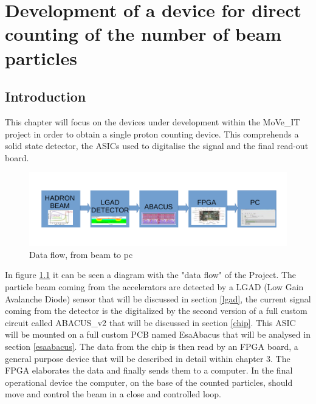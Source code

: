 \chapter{Development of a device for direct counting of the number of beam particles}

\section{Introduction}
This chapter will focus on the devices under development within the MoVe\_IT project in order to obtain a single proton counting device.
This comprehends a solid state detector, the ASICs used to digitalise the signal and the final read-out board.
\begin{figure}[H]
	\centering
	\includegraphics[width=0.99\linewidth]{IMG/ch2/BLOCK}
	\caption{Data flow, from beam to pc}
	\label{fig:block}
\end{figure}
\noindent In figure \ref{fig:block} it can be seen a diagram with the "data flow" of the Project.
The particle beam coming from the accelerators are detected by a LGAD (Low Gain Avalanche Diode) sensor that will be discussed in section \ref{lgad}, the current signal coming from the detector is the digitalized by the second version of a full custom circuit called ABACUS\_v2 that will be discussed in section \ref{chip}.
This ASIC will be mounted on a full custom PCB named EsaAbacus that will be analysed in section \ref{esaabacus}.
The data from the chip is then read by an FPGA board, a general purpose device that will be described in detail within chapter 3.
The FPGA elaborates the data and finally sends them to a computer. In the final operational device the computer, on the base of the counted particles, should move and control the beam in a close and controlled loop. 

